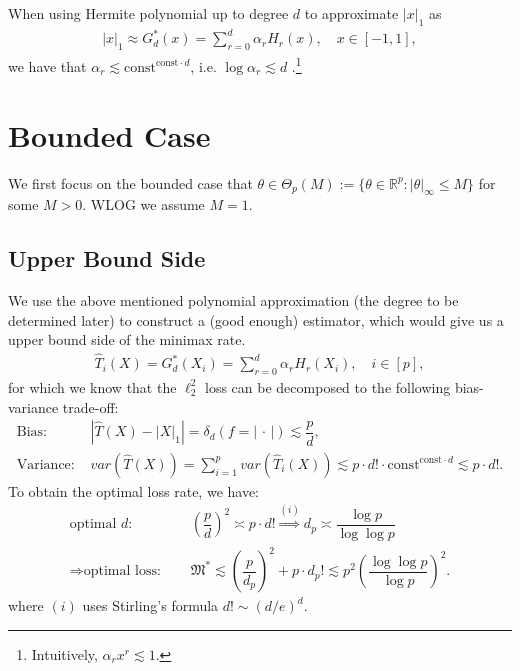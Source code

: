 \documentclass[11pt,a4paper]{article}
\numberwithin{equation}{section}%
\begin{document}
When using Hermite polynomial up to degree $ d $ to approximate $ \left\vert x \right\vert _1  $ as
\begin{align*}
    \left\vert x \right\vert _1 \approx G^*_d(x) = \sum_{r=0}^d \alpha _rH_r(x),\quad x\in [-1,1],
\end{align*}
we have that $ \alpha _r  \lesssim \mathrm{const}^{\mathrm{const} \cdot d} $, i.e. $ \log \alpha _r \lesssim d $ \cite{cai2011testing}.\footnote{Intuitively, $ \alpha _rx^r \lesssim 1 $.}








\section{Bounded Case}

We first focus on the bounded case that $ \theta \in \Theta _p(M):= \{\theta \in \mathbb{R}^p: \left\vert \theta  \right\vert _\infty \leq M \} $ for some $ M>0 $. WLOG we assume $ M=1 $.




\subsection{Upper Bound Side}

We use the above mentioned polynomial approximation (the degree to be determined later) to construct a (good enough) estimator, which would give us a upper bound side of the minimax rate.
\begin{align*}
    \hat{T}_i(X)= G^*_d(X_i) = \sum_{r=0}^d \alpha _rH_r(X_i),\quad i \in [p],
\end{align*}
for which we know that the $ \ell_2^2 $ loss can be decomposed to the following bias-variance trade-off:
\begin{align*}
     \text{Bias: }&\left\vert \hat{T}(X)- \left\vert X \right\vert _1  \right\vert = \delta _d(f=\left\vert \, \cdot \,  \right\vert ) \lesssim \dfrac{ p }{ d },\\
     \text{Variance: }&var(\hat{T}(X))=\sum_{i=1}^p var(\hat{T}_i(X)) \lesssim p\cdot d! \cdot  \mathrm{const}^{\mathrm{const} \cdot d} \lesssim p\cdot d!.
\end{align*}
To obtain the optimal loss rate, we have:
\begin{align*}
    \text{optimal }d: &\quad (\dfrac{ p }{ d } )^2 \asymp p\cdot d! \mathop{  \Rightarrow  }\limits^{(i)}  d_p\asymp \dfrac{ \log p }{ \log\log p } \\
     \Rightarrow \text{optimal loss: }&\quad \mathfrak{M}^* \lesssim \left( \dfrac{ p }{ d_p } \right) ^2 +p\cdot d_p! \lesssim p^2\left( \dfrac{ \log\log p }{ \log p } \right) ^2.
\end{align*}
where $(i)$ uses Stirling's formula $ d! \sim (d/e)^d $.
\end{document}
